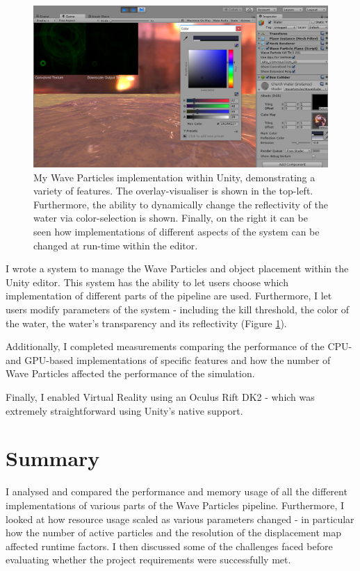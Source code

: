 \documentclass[12pt,a4paper,twoside]{report}
\begin{document}
\begin{figure}[h]
\centering
\includegraphics[width=0.8\linewidth]{wave_particles_gui}
\caption{My Wave Particles implementation within Unity, demonstrating a variety
of features. The overlay-visualiser is shown in the top-left. Furthermore, the
ability to dynamically change the reflectivity of the water via color-selection
is shown. Finally, on the right it can be seen how implementations of different
aspects of the system can be changed at run-time within the editor.}
\label{fig:wave_particles_gui}
\end{figure}

I wrote a system to manage the Wave Particles and object placement within the
Unity editor. This system has the ability to let users choose which
implementation of different parts of the pipeline are used. Furthermore, I let
users modify parameters of the system - including the kill threshold, the color
of the water, the water's transparency and its reflectivity (Figure
\ref{fig:wave_particles_gui}).

Additionally, I completed measurements comparing the performance of the CPU-
and GPU-based implementations of specific features and how the number of Wave
Particles affected the performance of the simulation.

Finally, I enabled Virtual Reality using an Oculus Rift DK2 - which was
extremely straightforward using Unity's native support.

\section{Summary}

I analysed and compared the performance and memory usage of all the different
implementations of various parts of the Wave Particles pipeline. Furthermore, I
looked at how resource usage scaled as various parameters changed - in
particular how the number of active particles and the resolution of the
displacement map affected runtime factors. I then discussed some of the
challenges faced before evaluating whether the project requirements were
successfully met.
\end{document}
